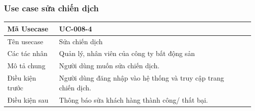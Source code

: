 \documentclass[12pt,a4paper]{article}
\begin{document}
    \subsubsection*{Use case sửa chiến dịch }
    \begin{table}[H]
        \centering
        \begin{tabular}{|p{3.5cm}|p{11.5cm}|c|}
            \hline
            Mã Usecase      & UC-008-4                                                        \\
            \hline
            Tên usecase     & Sửa chiến dịch                                                  \\
            \hline
            Các tác nhân    & Quản lý, nhân viên của công ty bất động sản                     \\
            \hline
            Mô tả chung     & Người dùng muốn sửa chiến dịch.                                 \\
            \hline

            Điều kiện trước & Người dùng đăng nhập vào hệ thống và truy cập trang chiến dịch. \\
            \hline

            Điều kiện sau   & Thông báo sửa khách hàng thành công/ thất bại.                  \\
            \hline


\end{tabular}
\end{table}
\end{document}
